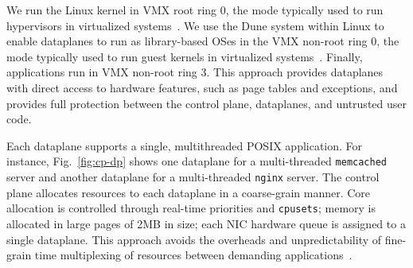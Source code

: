 We run the Linux kernel in VMX root ring 0, the mode typically used to
run hypervisors in virtualized
systems~\cite{DBLP:journals/computer/UhligNRSMABKLS05}. We use the
Dune system within Linux to enable dataplanes to run as library-based
OSes in the VMX non-root ring 0, the mode typically used to run guest
kernels in virtualized systems~\cite{belay2012dune}. Finally, applications run
in VMX non-root ring 3. This approach provides dataplanes with direct
access to hardware features, such as page tables and exceptions, and provides full
protection between the control plane, dataplanes, and untrusted user
code. %




Each \ix dataplane supports a single, multithreaded POSIX
application. For instance, Fig.~\ref{fig:cp-dp} shows one dataplane
for a multi-threaded \texttt{memcached} server and another dataplane
for a multi-threaded \texttt{nginx} server. The control plane allocates
resources to each dataplane in a coarse-grain manner. Core allocation
is controlled through real-time priorities and \texttt{cpusets};
memory is allocated in large pages of 2MB in size; each NIC hardware queue is
assigned to a single dataplane. This approach avoids the overheads and
unpredictability of fine-grain time multiplexing of resources between
demanding applications~\cite{Leverich:RHSU:2014}.

